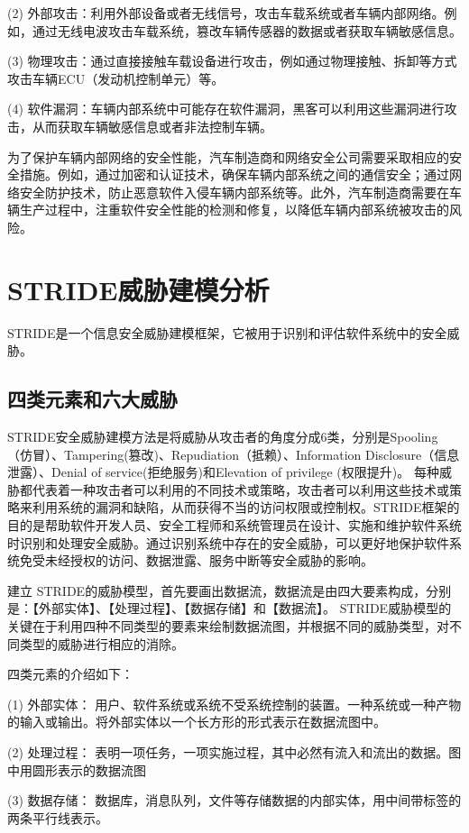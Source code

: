 (2) 外部攻击：利用外部设备或者无线信号，攻击车载系统或者车辆内部网络。例如，通过无线电波攻击车载系统，篡改车辆传感器的数据或者获取车辆敏感信息。

(3) 物理攻击：通过直接接触车载设备进行攻击，例如通过物理接触、拆卸等方式攻击车辆ECU（发动机控制单元）等。

(4) 软件漏洞：车辆内部系统中可能存在软件漏洞，黑客可以利用这些漏洞进行攻击，从而获取车辆敏感信息或者非法控制车辆。

为了保护车辆内部网络的安全性能，汽车制造商和网络安全公司需要采取相应的安全措施。例如，通过加密和认证技术，确保车辆内部系统之间的通信安全；通过网络安全防护技术，防止恶意软件入侵车辆内部系统等。此外，汽车制造商需要在车辆生产过程中，注重软件安全性能的检测和修复，以降低车辆内部系统被攻击的风险。


\section{STRIDE威胁建模分析}
STRIDE是一个信息安全威胁建模框架，它被用于识别和评估软件系统中的安全威胁。  
\subsection{四类元素和六大威胁}

STRIDE安全威胁建模方法是将威胁从攻击者的角度分成6类，分别是Spooling（仿冒）、Tampering(篡改)、Repudiation（抵赖）、Information Disclosure（信息泄露）、Denial of service(拒绝服务)和Elevation of privilege (权限提升)。
每种威胁都代表着一种攻击者可以利用的不同技术或策略，攻击者可以利用这些技术或策略来利用系统的漏洞和缺陷，从而获得不当的访问权限或控制权。STRIDE框架的目的是帮助软件开发人员、安全工程师和系统管理员在设计、实施和维护软件系统时识别和处理安全威胁。通过识别系统中存在的安全威胁，可以更好地保护软件系统免受未经授权的访问、数据泄露、服务中断等安全威胁的影响。

建立 STRIDE的威胁模型，首先要画出数据流，数据流是由四大要素构成，分别是：【外部实体】、【处理过程】、【数据存储】和【数据流】。
STRIDE威胁模型的关键在于利用四种不同类型的要素来绘制数据流图，并根据不同的威胁类型，对不同类型的威胁进行相应的消除。


四类元素的介绍如下：

(1) 外部实体：
用户、软件系统或系统不受系统控制的装置。一种系统或一种产物的输入或输出。将外部实体以一个长方形的形式表示在数据流图中。

(2) 处理过程：
表明一项任务，一项实施过程，其中必然有流入和流出的数据。图中用圆形表示的数据流图

(3) 数据存储：
数据库，消息队列，文件等存储数据的内部实体，用中间带标签的两条平行线表示。

